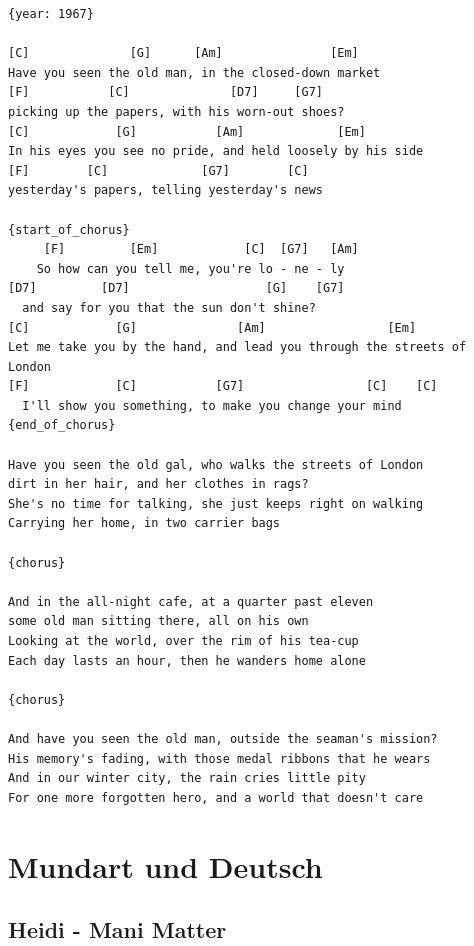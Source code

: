 \documentclass[
]{book}
\let\stdsection\section
\renewcommand\section{\clearpage\stdsection}
\begin{document}
\begin{verbatim}
{year: 1967}

[C]              [G]      [Am]               [Em]
Have you seen the old man, in the closed-down market
[F]           [C]              [D7]     [G7]
picking up the papers, with his worn-out shoes?
[C]            [G]           [Am]             [Em]
In his eyes you see no pride, and held loosely by his side
[F]        [C]             [G7]        [C]
yesterday's papers, telling yesterday's news

{start_of_chorus}
     [F]         [Em]            [C]  [G7]   [Am]
    So how can you tell me, you're lo - ne - ly
[D7]         [D7]                   [G]    [G7]
  and say for you that the sun don't shine?
[C]            [G]              [Am]                 [Em]
Let me take you by the hand, and lead you through the streets of London
[F]            [C]           [G7]                 [C]    [C]
  I'll show you something, to make you change your mind
{end_of_chorus}

Have you seen the old gal, who walks the streets of London
dirt in her hair, and her clothes in rags?
She's no time for talking, she just keeps right on walking
Carrying her home, in two carrier bags

{chorus}

And in the all-night cafe, at a quarter past eleven
some old man sitting there, all on his own
Looking at the world, over the rim of his tea-cup
Each day lasts an hour, then he wanders home alone

{chorus}

And have you seen the old man, outside the seaman's mission?
His memory's fading, with those medal ribbons that he wears
And in our winter city, the rain cries little pity
For one more forgotten hero, and a world that doesn't care

\end{verbatim}

\hypertarget{mundart-und-deutsch}{%
\chapter{Mundart und Deutsch}\label{mundart-und-deutsch}}

\hypertarget{heidi---mani-matter}{%
\section{Heidi - Mani Matter}\label{heidi---mani-matter}}
\end{document}
